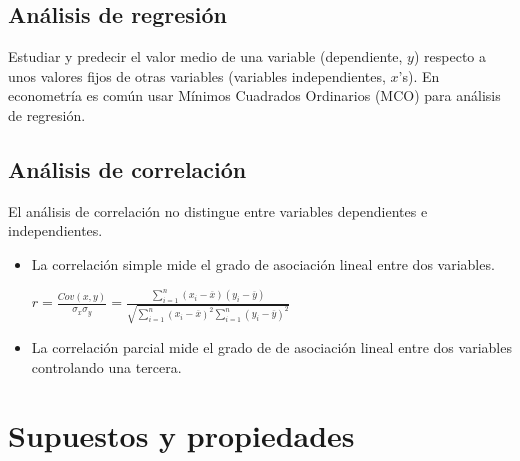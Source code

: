 \documentclass[10pt, a4paper, landscape]{extarticle}
\begin{document}
\begin{multicols}{3}
	\subsection*{Análisis de regresión}
		Estudiar y predecir el valor medio de una variable (dependiente, $y$) respecto a unos valores fijos de otras variables (variables independientes, $x$'s). En econometría es común usar Mínimos Cuadrados Ordinarios (MCO) para análisis de regresión.
	\subsection*{Análisis de correlación}
		El análisis de correlación no distingue entre variables dependientes e independientes.
		\begin{itemize}[leftmargin=*]
			\item La correlación simple mide el grado de asociación lineal entre dos variables.
			\begin{center}
				$r = \frac{Cov(x,y)}{\sigma_x \sigma_y} = \frac{\sum_{i=1}^n (x_i - \overline{x})(y_i - \overline{y})}{\sqrt{\sum_{i=1}^n (x_i - \overline{x})^2 \sum_{i=1}^n (y_i - \overline{y})^2}}$
			\end{center}
			\item La correlación parcial mide el grado de de asociación lineal entre dos variables controlando una tercera.
		\end{itemize}
\columnbreak
\section*{Supuestos y propiedades}

\end{multicols}
\end{document}
